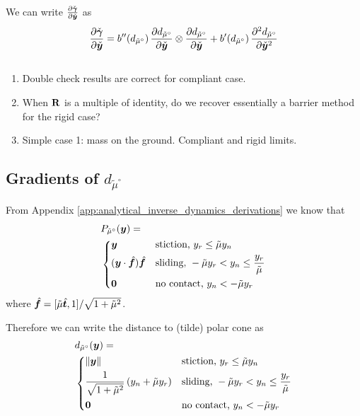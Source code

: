 We can write $\frac{\partial\check{{\bm\gamma}}}{\partial\check{{\bm{y}}}}$ as
\begin{eqnarray}
    \frac{\partial\check{{\bm\gamma}}}{\partial\check{{\bm{y}}}} =
    b''(d_{\tilde{\mu}^\circ})\,\frac{\partial
    d_{\tilde{\mu}^\circ}}{\partial\check{{\bm{y}}}}\otimes\frac{\partial
    d_{\tilde{\mu}^\circ}}{\partial\check{{\bm{y}}}} +
    b'(d_{\tilde{\mu}^\circ})\,\frac{\partial^2
    d_{\tilde{\mu}^\circ}}{\partial\check{{\bm{y}}}^2}
\end{eqnarray}

\subsection{}
\begin{enumerate}
    \item Double check results are correct for compliant case.
    \item When ${\mathbf{R}}$ is a multiple of identity, do we recover
    essentially a barrier method for the rigid case?
    \item Simple case 1: mass on the ground. Compliant and rigid limits.
\end{enumerate}

\subsection{Gradients of $d_{\tilde{\mu}^\circ}$}

From Appendix \ref{app:analytical_inverse_dynamics_derivations} we know that
\begin{align}
	&P_{\tilde\mu^\circ}(\vf{y}) = 
	\label{eq:ell_R_piecewise}\\	
&\begin{dcases}
	\vf{y} & \text{stiction, } y_r \le \tilde\mu y_n\\
	(\vf{y}\cdot\hat{\vf{f}})\hat{\vf{f}} & \text{sliding, } -\tilde\mu y_r < y_n \leq \frac{y_r}{\tilde\mu}\\
    \vf{0} & \text{no contact, } y_n < -\tilde\mu y_r
\end{dcases}\nonumber	
\end{align}
where $\hat{{\bm{f}}}=[\tilde{\mu}\hat{{\bm{t}}}, 1]/\sqrt{1+\tilde{\mu}^2}$.

Therefore we can write the distance to (tilde) polar cone as
\begin{align}
	&d_{\tilde{\mu}^\circ}(\vf{y}) = 
	\label{eq:distance_to_polar}\\	
&\begin{dcases}
	\Vert\vf{y}\Vert & \text{stiction, } y_r \le \tilde\mu y_n\\
	\frac{1}{\sqrt{1+\tilde\mu^2}}\left(y_n + \tilde\mu y_r\right) & \text{sliding, } -\tilde\mu y_r < y_n \leq \frac{y_r}{\tilde\mu}\\
    \vf{0} & \text{no contact, } y_n < -\tilde\mu y_r
\end{dcases}\nonumber
\end{align}

